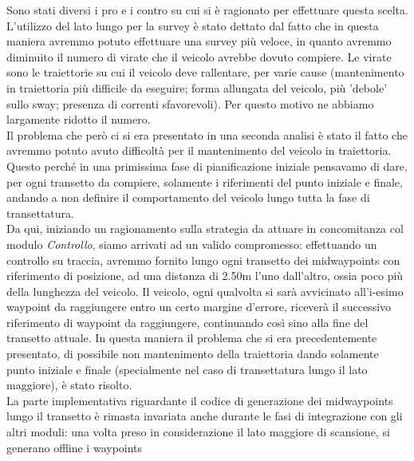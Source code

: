 \documentclass{article}
\begin{document}
                Sono stati diversi i pro e i contro su cui si è ragionato per effettuare questa scelta.\\
                L'utilizzo del lato lungo per la survey è stato dettato dal fatto che in questa maniera avremmo potuto effettuare una survey 
                più veloce, in quanto avremmo diminuito il numero di virate che il veicolo avrebbe dovuto compiere. Le virate sono le traiettorie su cui il veicolo 
                deve rallentare, per varie cause (mantenimento in traiettoria più difficile da eseguire; forma allungata del veicolo, più 
                'debole' sullo sway; presenza di correnti sfavorevoli). Per questo motivo ne abbiamo largamente ridotto il numero.\\
                Il problema che però ci si era presentato in una seconda analisi è stato il fatto che avremmo potuto avuto difficoltà per il mantenimento
                del veicolo in traiettoria. Questo perché in una primissima fase di pianificazione iniziale 
                pensavamo di dare, per ogni transetto da compiere, solamente i riferimenti del punto iniziale e finale, andando a non definire il 
                comportamento del veicolo lungo tutta la fase di transettatura.\\
                Da qui, iniziando un ragionamento 
                sulla strategia da attuare in concomitanza col modulo \textit{Controllo}, siamo arrivati ad un valido compromesso: effettuando un controllo su traccia, 
                avremmo fornito lungo ogni transetto dei midwaypoints con riferimento di posizione, ad una distanza di 2.50m l'uno dall'altro, 
                ossia poco più della lunghezza del veicolo. Il veicolo, ogni qualvolta si sarà avvicinato all'i-esimo waypoint da raggiungere 
                entro un certo margine d'errore,
                riceverà il successivo riferimento di waypoint da raggiungere, continuando così sino alla fine del transetto attuale. 
                In questa maniera il problema che si era
                precedentemente presentato, di possibile non mantenimento della traiettoria dando solamente punto iniziale e finale (specialmente nel caso di transettatura 
                lungo il lato maggiore), è stato risolto.\\
                La parte implementativa riguardante il codice di generazione dei midwaypoints lungo il transetto è rimasta invariata anche durante le fasi di integrazione 
                con gli altri moduli: una volta preso in considerazione il lato maggiore di scansione, si generano offline i waypoints 
\end{document}
